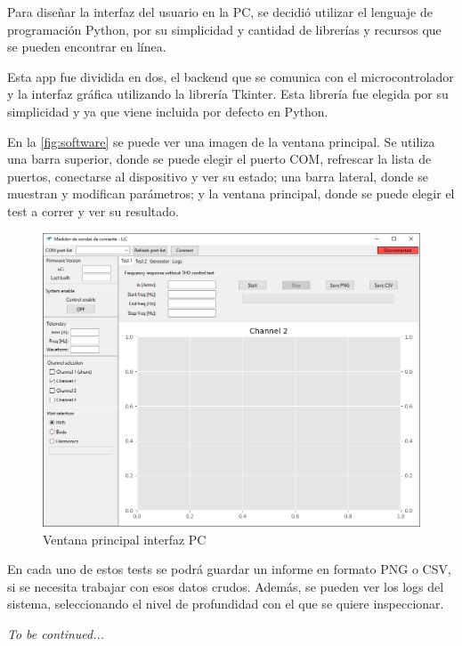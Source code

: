 \documentclass[../et.tex]{subfiles}
\begin{document}
Para diseñar la interfaz del usuario en la PC, se decidió utilizar el lenguaje de programación Python, por su simplicidad y cantidad de librerías y recursos que se pueden encontrar en línea.

Esta app fue dividida en dos, el backend que se comunica con el microcontrolador y la interfaz gráfica utilizando la librería Tkinter. Esta librería fue elegida por su simplicidad y ya que viene incluida por defecto en Python.

En la \autoref{fig:software} se puede ver una imagen de la ventana principal. Se utiliza una barra superior, donde se puede elegir el puerto COM, refrescar la lista de puertos, conectarse al dispositivo y ver su estado; una barra lateral, donde se muestran y modifican parámetros; y la ventana principal, donde se puede elegir el test a correr y ver su resultado.

\begin{figure}[!htbp]
    \centering
    \includegraphics[scale=0.6]{../images/software-gui.png}
    \caption{Ventana principal interfaz PC}
    \label{fig:software}
\end{figure}

En cada uno de estos tests se podrá guardar un informe en formato PNG o CSV, si se necesita trabajar con esos datos crudos. Además, se pueden ver los logs del sistema, seleccionando el nivel de profundidad con el que se quiere inspeccionar.

\textit{To be continued...}
\end{document}

